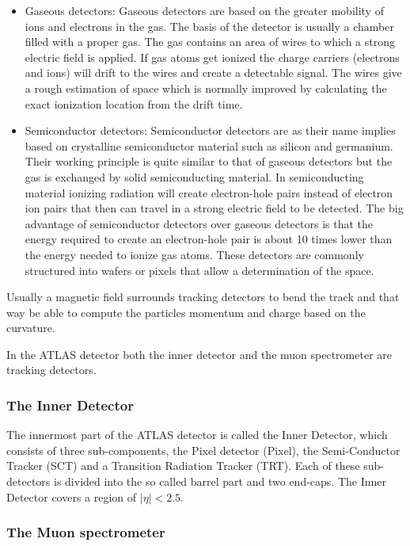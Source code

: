 \begin{itemize}
\item Gaseous detectors: Gaseous detectors are based on the greater mobility of ions and electrons in the gas. The basis of the detector is usually a chamber filled with a proper gas. The gas contains an area of wires to which a strong electric field is applied. If gas atoms get ionized the charge carriers (electrons and ions) will drift to the wires and create a detectable signal. The wires give a rough estimation of space which is normally improved by calculating the exact ionization location from the drift time.

\item Semiconductor detectors: Semiconductor detectors are as their name implies based on crystalline semiconductor material such as silicon and germanium. Their working principle is quite similar to that of gaseous detectors but the gas is exchanged by solid semiconducting material. In semiconducting material ionizing radiation will create electron-hole pairs instead of electron ion pairs that then can travel in a strong electric field to be detected. The big advantage of semiconductor detectors over gaseous detectors is that the energy required to create an electron-hole pair is about 10 times lower than the energy needed to ionize gas atoms. These detectors are commonly structured into wafers or pixels that allow a determination of the space.
\end{itemize}

Usually a magnetic field surrounds tracking detectors to bend the track and that way be able to compute the particles momentum and charge based on the curvature.\cite{leo}


In the ATLAS detector both the inner detector and the muon spectrometer are tracking detectors.

\subsubsection{The Inner Detector}

The innermost part of the ATLAS detector is called the Inner Detector, which consists of three sub-components, the Pixel detector (Pixel), the Semi-Conductor Tracker (SCT) and a Transition Radiation Tracker (TRT). Each of these sub-detectors is divided into the so called barrel part and two end-caps. The Inner Detector covers a region of $|\eta| < \num{2.5}$.

\subsubsection{The Muon spectrometer}

